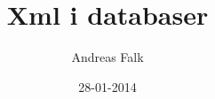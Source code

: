 \documentclass[a4paper,twoside,10pt]{report}
\begin{document}
\pagestyle{empty} %



\title{Xml i databaser}
\author{Andreas Falk}
\date{28-01-2014} %
\maketitle



\tableofcontents %
\cleardoublepage %

\pagestyle{plain} %


 









\end{document}

